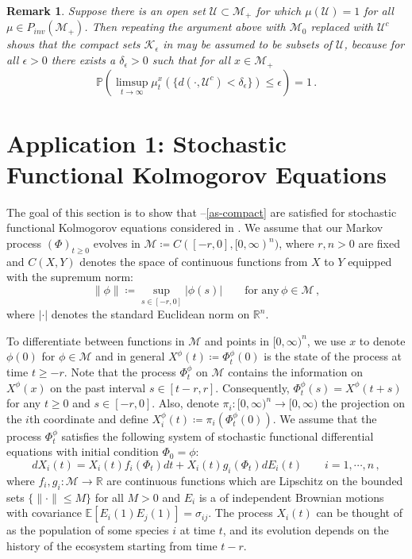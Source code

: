 \documentclass[final]{amsart}
\newtheorem{rem}[thm]{Remark}
\numberwithin{thm}{section}
\numberwithin{equation}{section}
\newcommand{\E}{\mathbb{E}}
\newcommand{\U}{\mathcal{U}}
\newcommand{\Prb}{\mathbb{P}}
\newcommand{\mcM}{\mathcal{M}}
\newcommand{\R}{\mathbb{R}}
\newcommand{\inv}{\mathcal{M}_+}
\newcommand{\K}{\mathcal{K}}
\begin{document}
 \begin{rem}\label{K-contained-in-strictly-positive}
     Suppose there is an open set $\U \subset \inv$ for which $\mu(\U) = 1$ for all $\mu \in P_{inv}(\inv)$. Then repeating the argument above with $\mcM_0$ replaced with $\U^c$ shows that the compact sets $\K_\epsilon$ in  may be assumed to be subsets of $\U$, because for all $\epsilon > 0$ there exists a $\delta_\epsilon > 0$ such that for all $x \in \inv$ $$\Prb(\limsup_{t \to \infty} \mu_t^x(\{d(\cdot, \U^c) < \delta_\epsilon\}) \leq \epsilon) = 1 \,.$$
 \end{rem}
 

\section{Application 1: Stochastic Functional Kolmogorov Equations}\label{sec:funct}

The goal of this section is to show that --\ref{as-compact}  are satisfied for stochastic functional Kolmogorov equations considered in \cite{functional}. We assume that our Markov process $(\Phi)_{t\geq 0}$ evolves in $\mcM \coloneqq C([-r,0], [0,\infty)^n)$, where $r, n > 0$ are fixed and $C(X,Y)$ denotes the space of continuous functions from $X$ to $Y$ equipped with the supremum norm:
\begin{equation}
    \|\phi\| \coloneqq \sup_{s \in [-r,0]} |\phi(s)| \qquad 
    \textrm{for any} \, \phi \in \mcM \,,
\end{equation}
where $|\cdot|$ denotes the standard Euclidean norm on $\R^n$.

To differentiate between functions in $\mcM$ and points in $[0,\infty)^n$, we use $x$ to denote $\phi(0)$ for $\phi \in \mcM$
and in general $X^\phi(t) \coloneqq \Phi_t^\phi(0)$ is 
the state of the process at time $t \geq -r$. Note that 
the process $\Phi_t^\phi$ on $\mcM$ contains the information 
on $X^\phi(x)$ on the past interval $s \in [t-r, r]$. Consequently, $\Phi_t^\phi(s) = X^\phi(t+s)$ for any $t \geq 0$ and $s \in [-r, 0]$. Also, denote $\pi_i: [0,\infty)^n \to [0,\infty)$ the projection on the $i$th coordinate and define $X_i^\phi(t) \coloneqq \pi_i(\Phi_t^\phi(0))$.
 We assume that the process $\Phi_t^\phi$ satisfies the following system of stochastic functional differential equations with initial condition 
 $\Phi_0 = \phi$: 
 \begin{equation}\label{eq:func-eq}
    dX_i(t) = X_i(t)f_i(\Phi_t)dt + X_i(t)g_i(\Phi_t)dE_i(t) \qquad 
    i = 1, \cdots, n \,,
\end{equation} 
where $f_i,g_i: \mcM \to \R$ are continuous functions which are Lipschitz on the bounded sets $\{\|\cdot\| \leq M\}$ for all $M > 0$ and $E_i$ is a of independent Brownian motions with covariance $\E[E_i(1)E_j(1)] = \sigma_{ij}$. The process $X_i(t)$ can be thought of as the population of some species $i$ at time $t$, and its evolution depends on the history of the ecosystem starting from time $t-r$. 
\end{document}
